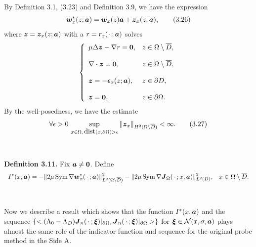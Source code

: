   
  By Definition 3.1, (3.23) and Definition 3.9, we have the expression
  $$\displaystyle
  \mbox{\boldmath $w$}_x^*(z;\mbox{\boldmath $a$})=\mbox{\boldmath $w$}_x(z)\mbox{\boldmath $a$}+
  \mbox{\boldmath $z$}_x(z;\mbox{\boldmath $a$}),
  \tag {3.26}
  $$
  where $\mbox{\boldmath $z$}=\mbox{\boldmath $z$}_x(z;\mbox{\boldmath $a$})$ with a $r=r_x(\,\cdot\,;\mbox{\boldmath $a$})$ solves
  $$\left\{
 \begin{array}{ll}
 \mu\Delta\mbox{\boldmath $z$}-\nabla r=\mbox{\boldmath $0$}, & z\in\Omega\setminus\overline{D},
 \\
 \\
 \displaystyle
 \nabla\cdot\mbox{\boldmath $z$}=0, &  z\in\Omega\setminus\overline{D},
 \\
 \\
 \displaystyle
 \mbox{\boldmath $z$}=-\mbox{\boldmath $\epsilon$}_x(z;\mbox{\boldmath $a$}), & z\in\partial D,
 \\
 \\
 \displaystyle
 \mbox{\boldmath $z$}=\mbox{\boldmath $0$}, & z\in\partial\Omega.
 \end{array}
 \right.
 $$
 By the well-posedness, we have the estimate
 $$\displaystyle
 \forall\epsilon>0 \,\sup_{x\in\Omega,\,\text{dist}(x,\partial\Omega)>\epsilon}
 \Vert\mbox{\boldmath $z$}_x\Vert_{H^2(\Omega\setminus\overline{D})}<\infty.
 \tag {3.27}
  $$
  
  
  
  
  
  
  
  
  

  
  $\quad$
  
  
  {\bf\noindent Definition 3.11.}  Fix $\mbox{\boldmath $a$}\not=\mbox{\boldmath $0$}$.
  Define
  $$\begin{array}{ll}
  \displaystyle
  I^*(x,\mbox{\boldmath $a$})
  =-\Vert 2\mu\,\text{Sym}\,\nabla\mbox{\boldmath $w$}_x^*(\,\cdot\,;\mbox{\boldmath $a$})\Vert_{L^2(\Omega\setminus\overline{D})}^2
  -\Vert 2\mu\,\text{Sym}\,\nabla \mbox{\boldmath $J$}_{\Omega}(\,\cdot\,;x,\mbox{\boldmath $a$})\Vert_{L^2(D)}^2,
  &
  \displaystyle
  x\in\Omega\setminus\overline{D}.
  \end{array}
  $$
  
  
  $\quad$
  
  

 
Now we describe a result which shows that the function $I^*(x,\mbox{\boldmath $a$})$ and the sequence
$\{<(\Lambda_0-\Lambda_D)\mbox{\boldmath $J$}_n(\,\cdot\,;\mbox{\boldmath $\xi$})\vert_{\partial\Omega},
\mbox{\boldmath $J$}_n(\,\cdot\,;\mbox{\boldmath $\xi$})\vert_{\partial\Omega}>\}$
for $\mbox{\boldmath $\xi$}\in{\cal N}(x,\sigma,\mbox{\boldmath $a$})$
plays almost the same role of the indicator function and sequence for the original probe method in the Side A.





